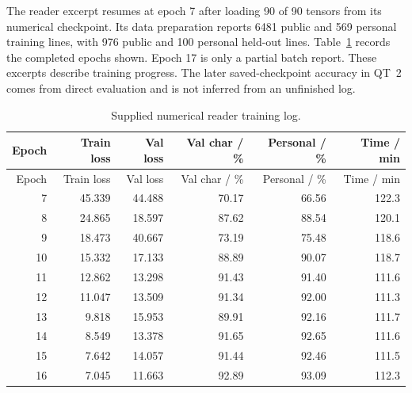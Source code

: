 The reader excerpt resumes at epoch 7 after loading 90 of 90 tensors from its numerical checkpoint. Its data preparation reports 6481 public and 569 personal training lines, with 976 public and 100 personal held-out lines. Table~\ref{tab:app-reader-log} records the completed epochs shown. Epoch 17 is only a partial batch report. These excerpts describe training progress. The later saved-checkpoint accuracy in QT~2 comes from direct evaluation and is not inferred from an unfinished log.
\begin{longtable}{rrrrrr}
\caption{Supplied numerical reader training log.}\label{tab:app-reader-log}\\
\toprule Epoch & Train loss & Val loss & Val char / \% & Personal / \% & Time / min\\\midrule\endfirsthead
\toprule Epoch & Train loss & Val loss & Val char / \% & Personal / \% & Time / min\\\midrule\endhead
7 & 45.339 & 44.488 & 70.17 & 66.56 & 122.3\\
8 & 24.865 & 18.597 & 87.62 & 88.54 & 120.1\\
9 & 18.473 & 40.667 & 73.19 & 75.48 & 118.6\\
10 & 15.332 & 17.133 & 88.89 & 90.07 & 118.7\\
11 & 12.862 & 13.298 & 91.43 & 91.40 & 111.6\\
12 & 11.047 & 13.509 & 91.34 & 92.00 & 111.3\\
13 & 9.818 & 15.953 & 89.91 & 92.16 & 111.7\\
14 & 8.549 & 13.378 & 91.65 & 92.65 & 111.6\\
15 & 7.642 & 14.057 & 91.44 & 92.46 & 111.5\\
16 & 7.045 & 11.663 & 92.89 & 93.09 & 112.3\\
\bottomrule\end{longtable}
